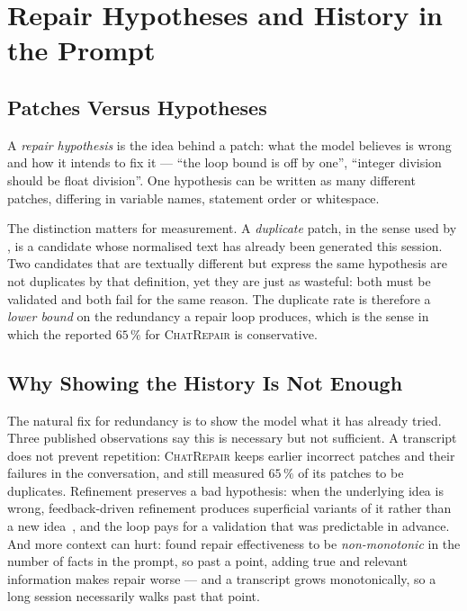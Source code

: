 \section{Repair Hypotheses and History in the Prompt}
\label{sec:bg-hypothesis}

\subsection{Patches Versus Hypotheses}

A \emph{repair hypothesis} is the idea behind a patch: what the model believes
is wrong and how it intends to fix it --- ``the loop bound is off by one'',
``integer division should be float division''. One hypothesis can be written
as many different patches, differing in variable names, statement order or
whitespace.

The distinction matters for measurement. A \emph{duplicate} patch, in the sense
used by \citet{chen2025conversational}, is a candidate whose normalised text
has already been generated this session. Two candidates that are textually
different but express the same hypothesis are not duplicates by that
definition, yet they are just as wasteful: both must be validated and both fail
for the same reason. The duplicate rate is therefore a \emph{lower bound} on
the redundancy a repair loop produces, which is the sense in which the reported
$65\,\%$ for \textsc{ChatRepair} is conservative.

\subsection{Why Showing the History Is Not Enough}

The natural fix for redundancy is to show the model what it has already tried.
Three published observations say this is necessary but not sufficient. A
transcript does not prevent repetition: \textsc{ChatRepair} keeps earlier
incorrect patches and their failures in the conversation, and
\citet{chen2025conversational} still measured $65\,\%$ of its patches to be
duplicates. Refinement preserves a bad hypothesis: when the underlying idea is
wrong, feedback-driven refinement produces superficial variants of it rather
than a new idea~\citep{le2026semantic}, and the loop pays for a validation that
was predictable in advance. And more context can hurt:
\citet{parasaram2025factselection} found repair effectiveness to be
\emph{non-monotonic} in the number of facts in the prompt, so past a point,
adding true and relevant information makes repair worse --- and a transcript
grows monotonically, so a long session necessarily walks past that point.


